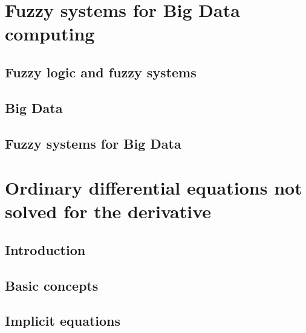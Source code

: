 \documentclass[
  fontsize=12pt,
  a4paper,  %
  twoside,  %
  bibliography=totoc,
  headsepline,
  cleardoublepage=empty,
  draft=false
]{scrbook}
\theoremstyle{nonumberplain}
\begin{document}
%
%
\mainmatter

\part{Fuzzy systems for Big Data computing}

%

\chapter{Fuzzy logic and fuzzy systems}


\chapter{Big Data}


\chapter{Fuzzy systems for Big Data}
\label{ch:fuzzy-bigdata}


\part{Ordinary differential equations not solved for the derivative}

\chapter{Introduction}


\chapter{Basic concepts}


\chapter{Implicit equations}

\end{document}
